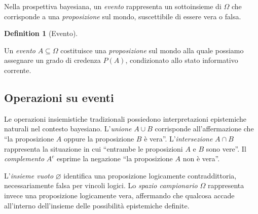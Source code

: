 \documentclass[
  letterpaper,
  DIV=11,
  numbers=noendperiod,
  oneside]{scrreprt}
\theoremstyle{definition}
\theoremstyle{plain}
\theoremstyle{definition}
\newtheorem{definition}{Definition}[chapter]
\theoremstyle{remark}
\begin{document}
Nella prospettiva bayesiana, un \emph{evento} rappresenta un
sottoinsieme di \(\Omega\) che corrisponde a una \emph{proposizione} sul
mondo, suscettibile di essere vera o falsa.

\begin{definition}[Evento]\protect\hypertarget{def-event-bayesian}{}\label{def-event-bayesian}

Un \emph{evento} \(A \subseteq \Omega\) costituisce una
\emph{proposizione} sul mondo alla quale possiamo assegnare un grado di
credenza \(P(A)\), condizionato allo stato informativo corrente.

\end{definition}

\subsection{Operazioni su eventi}\label{operazioni-su-eventi}

Le operazioni insiemistiche tradizionali possiedono interpretazioni
epistemiche naturali nel contesto bayesiano. L'\emph{unione}
\(A \cup B\) corrisponde all'affermazione che ``la proposizione \(A\)
oppure la proposizione \(B\) è vera''. L'\emph{intersezione}
\(A \cap B\) rappresenta la situazione in cui ``entrambe le proposizioni
\(A\) e \(B\) sono vere''. Il \emph{complemento} \(A^c\) esprime la
negazione ``la proposizione \(A\) non è vera''.

L'\emph{insieme vuoto} \(\varnothing\) identifica una proposizione
logicamente contraddittoria, necessariamente falsa per vincoli logici.
Lo \emph{spazio campionario} \(\Omega\) rappresenta invece una
proposizione logicamente vera, affermando che qualcosa accade
all'interno dell'insieme delle possibilità epistemiche definite.
\end{document}

